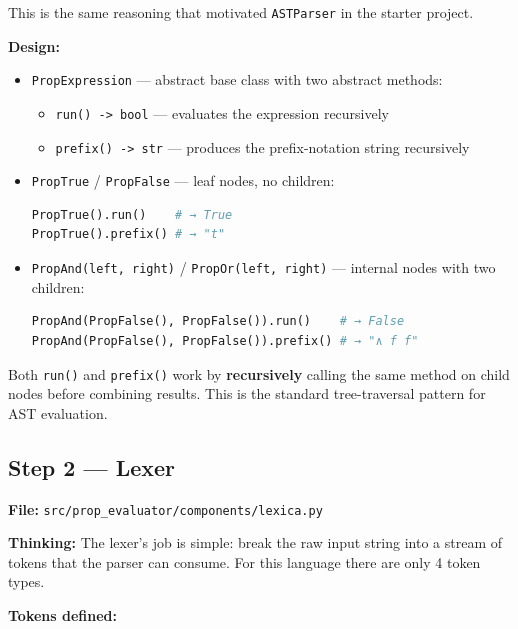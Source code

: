 \documentclass[12pt,a4paper]{article}
\begin{document}
This is the same reasoning that motivated \texttt{ASTParser} in the starter project.

\textbf{Design:}

\begin{itemize}
    \item \texttt{PropExpression} --- abstract base class with two abstract methods:
    \begin{itemize}
        \item \texttt{run() -> bool} --- evaluates the expression recursively
        \item \texttt{prefix() -> str} --- produces the prefix-notation string recursively
    \end{itemize}

    \item \texttt{PropTrue} / \texttt{PropFalse} --- leaf nodes, no children:

    \begin{lstlisting}[language=Python]
PropTrue().run()    # → True
PropTrue().prefix() # → "t"
    \end{lstlisting}

    \item \texttt{PropAnd(left, right)} / \texttt{PropOr(left, right)} --- internal nodes with two
          children:
    \begin{lstlisting}[language=Python]
PropAnd(PropFalse(), PropFalse()).run()    # → False
PropAnd(PropFalse(), PropFalse()).prefix() # → "∧ f f"
    \end{lstlisting}
\end{itemize}

Both \texttt{run()} and \texttt{prefix()} work by \textbf{recursively} calling the same method on
child nodes before combining results. This is the standard tree-traversal
pattern for AST evaluation.


\subsection{Step 2 --- Lexer}

\textbf{File:} \texttt{src/prop\_evaluator/components/lexica.py}

\textbf{Thinking:} The lexer's job is simple: break the raw input string into a
stream of tokens that the parser can consume. For this language there are only 4
token types.

\textbf{Tokens defined:}
\end{document}
